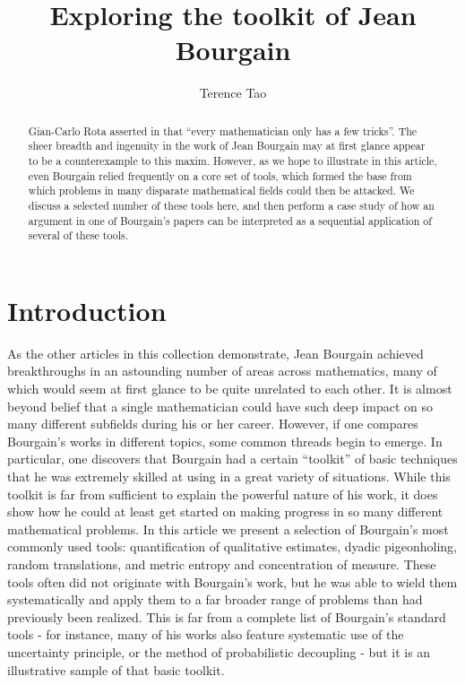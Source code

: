 \documentclass[12pt,a4paper,reqno]{amsart}
\numberwithin{equation}{section}
\theoremstyle{plain}
\theoremstyle{definition}
\begin{document}
\title{Exploring the toolkit of Jean Bourgain}

\author{Terence Tao}
\address{UCLA Department of Mathematics, Los Angeles, CA 90095-1555.}



\begin{abstract}  Gian-Carlo Rota asserted in \cite{rota} that ``every mathematician only has a few tricks''.  The sheer breadth and ingenuity in the work of Jean Bourgain may at first glance appear to be a counterexample to this maxim.  However, as we hope to illustrate in this article, even Bourgain relied frequently on a core set of tools, which formed the base from which problems in many disparate mathematical fields could then be attacked.  We discuss a selected number of these tools here, and then perform a case study of how an argument in one of Bourgain's papers \cite{similarity} can be interpreted as a sequential application of several of these tools.
\end{abstract}

\maketitle


\section{Introduction}

As the other articles in this collection demonstrate, Jean Bourgain achieved breakthroughs in an astounding number of areas across mathematics, many of which would seem at first glance to be quite unrelated to each other.  It is almost beyond belief that a single mathematician could have such deep impact on so many different subfields during his or her career.  However, if one compares Bourgain's works in different topics, some common threads begin to emerge.  In particular, one discovers that Bourgain had a certain ``toolkit'' of basic techniques that he was extremely skilled at using in a great variety of situations.  While this toolkit is far from sufficient to explain the powerful nature of his work, it does show how he could at least get started on making progress in so many different mathematical problems.  In this article we present a selection of Bourgain's most commonly used tools: quantification of qualitative estimates, dyadic pigeonholing, random translations, and metric entropy and concentration of measure.  These tools often did not originate with Bourgain's work, but he was able to wield them systematically and apply them to a far broader range of problems than had previously been realized.  This is far from a complete list of Bourgain's standard tools - for instance, many of his works also feature systematic use of the uncertainty principle, or the method of probabilistic decoupling - but it is an illustrative sample of that basic toolkit.
\end{document}
